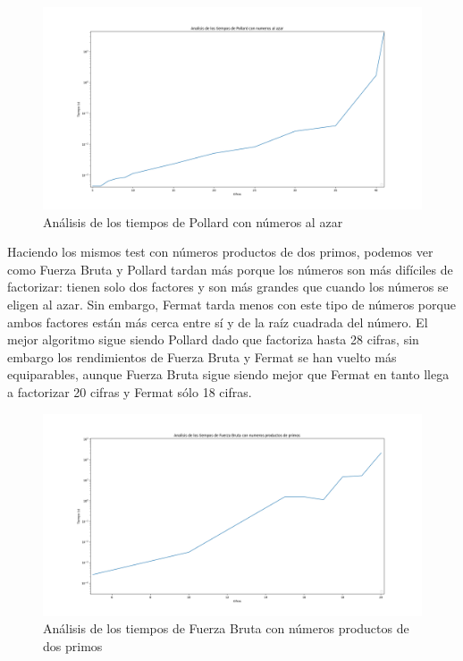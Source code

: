 \documentclass{article}
\begin{document}
    \begin{figure}[ht!]
        \centering
        \includegraphics[scale=0.3]{Figure_5}
        \caption{Análisis de los tiempos de Pollard con números al azar}
        \label{fig:Figure_5}
    \end{figure}


    \newpage


    Haciendo los mismos test con números productos de dos primos, podemos ver como Fuerza  Bruta y Pollard tardan más porque los números son más difíciles de factorizar: tienen solo dos factores y son más grandes que cuando los números se eligen al azar. Sin embargo, Fermat tarda menos con este tipo de números porque ambos factores están más cerca entre sí y de la raíz cuadrada del número. 
    El mejor algoritmo sigue siendo Pollard dado que factoriza hasta 28 cifras, sin embargo los rendimientos de Fuerza Bruta y Fermat se han vuelto más equiparables, aunque Fuerza Bruta sigue siendo mejor que Fermat en tanto llega a factorizar 20 cifras y Fermat sólo 18 cifras.

    \begin{figure}[ht!]
        \centering
        \includegraphics[scale=0.3]{Figure_2}
        \caption{Análisis de los tiempos de Fuerza Bruta con números productos de dos primos}
        \label{fig:Figure_2}
    \end{figure}
\end{document}
